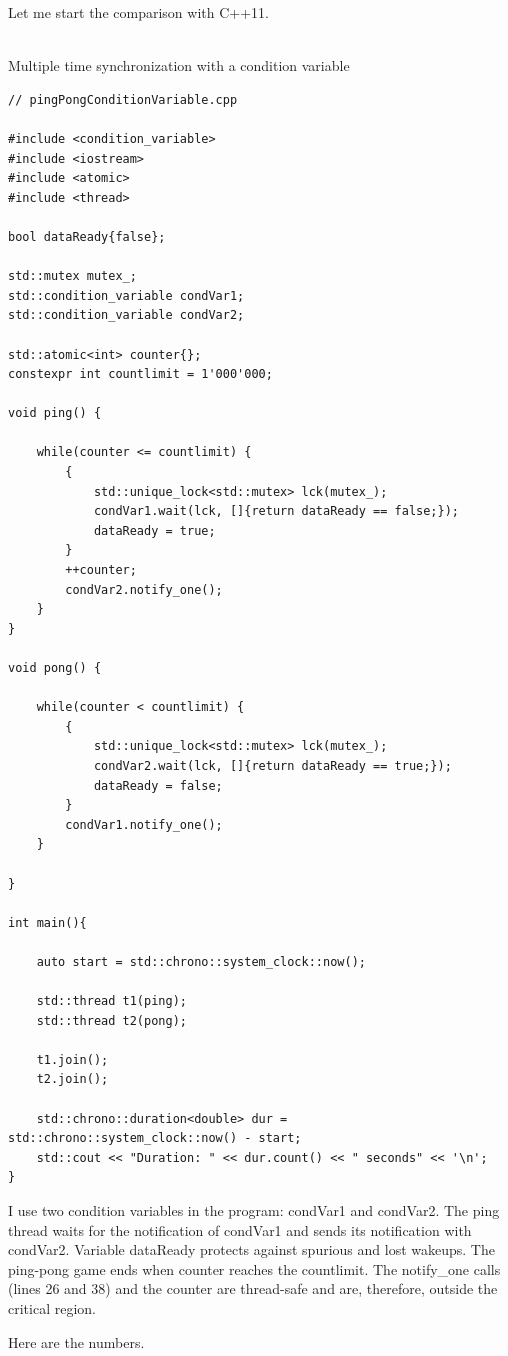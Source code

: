 Let me start the comparison with C++11.


\hspace*{\fill} \\ %
\noindent
Multiple time synchronization with a condition variable
\begin{lstlisting}[style=styleCXX]
// pingPongConditionVariable.cpp

#include <condition_variable>
#include <iostream>
#include <atomic>
#include <thread>

bool dataReady{false};

std::mutex mutex_;
std::condition_variable condVar1;
std::condition_variable condVar2;

std::atomic<int> counter{};
constexpr int countlimit = 1'000'000;

void ping() {

	while(counter <= countlimit) {
		{
			std::unique_lock<std::mutex> lck(mutex_);
			condVar1.wait(lck, []{return dataReady == false;});
			dataReady = true;
		}
		++counter;
		condVar2.notify_one();
	}
}

void pong() {

	while(counter < countlimit) {
		{
			std::unique_lock<std::mutex> lck(mutex_);
			condVar2.wait(lck, []{return dataReady == true;});
			dataReady = false;
		}
		condVar1.notify_one();
	}

}

int main(){

	auto start = std::chrono::system_clock::now();
	
	std::thread t1(ping);
	std::thread t2(pong);
	
	t1.join();
	t2.join();
	
	std::chrono::duration<double> dur = std::chrono::system_clock::now() - start;
	std::cout << "Duration: " << dur.count() << " seconds" << '\n';
}
\end{lstlisting}

I use two condition variables in the program: condVar1 and condVar2. The ping thread waits for the notification of condVar1 and sends its notification with condVar2. Variable dataReady protects against spurious and lost wakeups. The ping-pong game ends when counter reaches the countlimit. The notify\_one calls (lines 26 and 38) and the counter are thread-safe and are, therefore, outside the critical region.

Here are the numbers.

